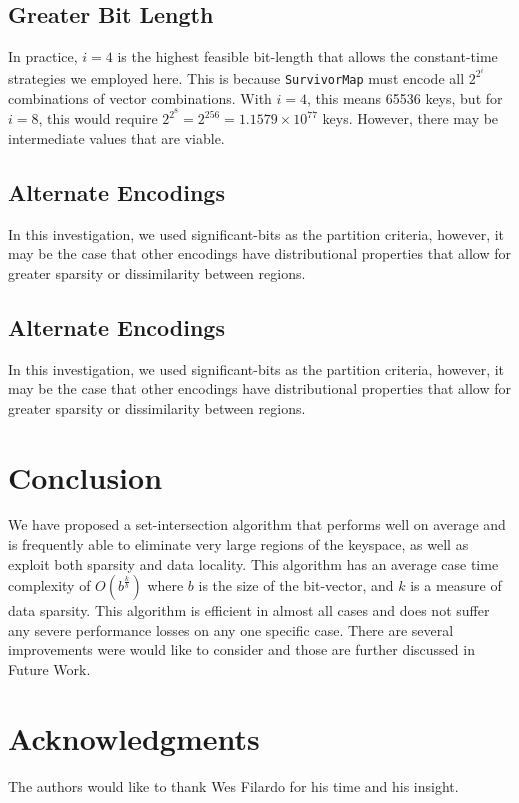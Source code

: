 \documentclass[11pt,letterpaper]{article}
\begin{document}
\subsection{Greater Bit Length}
In practice, $i=4$ is the highest feasible bit-length that allows the constant-time
strategies we employed here.  This is because {\tt SurvivorMap} must encode
all $2^{2^i}$ combinations of vector combinations.  With $i=4$, this means
65536 keys, but for $i=8$, this would require $2^{2^8}=2^256=1.1579\times10^{77}$
keys.  However, there may be intermediate values that are viable.

\subsection{Alternate Encodings}
In this investigation, we used significant-bits as the partition criteria,
however, it may be the case that other encodings have distributional properties
that allow for greater sparsity or dissimilarity between regions.

\subsection{Alternate Encodings}
In this investigation, we used significant-bits as the partition criteria,
however, it may be the case that other encodings have distributional properties
that allow for greater sparsity or dissimilarity between regions.


\section{Conclusion}
We have proposed a set-intersection algorithm that performs well
on average and is frequently able to eliminate very large regions of
the keyspace, as well as exploit both sparsity and data locality.  
This algorithm has an average case time complexity of
$O\left(b^{\frac{k}{b}}\right)$ where $b$ is the size of the bit-vector,
and $k$ is a measure of data sparsity. This algorithm is efficient in almost
all cases and does not suffer any severe performance losses on any one
specific case. There are several improvements were would like to consider
and those are further discussed in Future Work.

\section*{Acknowledgments}
The authors would like to thank Wes Filardo for his time and his insight.

%

\end{document}
